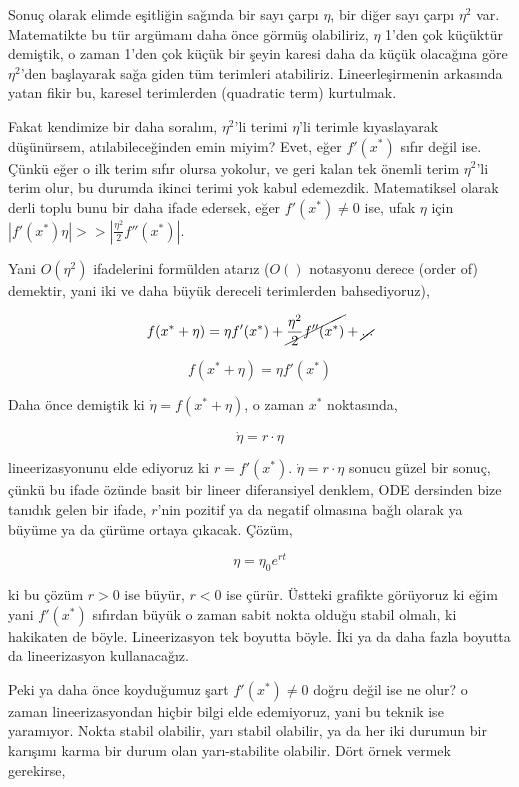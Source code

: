 \documentclass[12pt,fleqn]{article}\usepackage{../../common}
\begin{document}
Sonuç olarak elimde eşitliğin sağında bir sayı çarpı $\eta$, bir diğer sayı
çarpı $\eta^2$ var. Matematikte bu tür argümanı daha önce görmüş olabiliriz,
$\eta$ 1'den çok küçüktür demiştik, o zaman 1'den çok küçük bir şeyin karesi
daha da küçük olacağına göre $\eta^2$'den başlayarak sağa giden tüm terimleri
atabiliriz. Lineerleşirmenin arkasında yatan fikir bu, karesel terimlerden
(quadratic term) kurtulmak.

Fakat kendimize bir daha soralım, $\eta^2$'li terimi $\eta$'li terimle
kıyaslayarak düşünürsem, atılabileceğinden emin miyim? Evet, eğer $f'(x^\ast)$
sıfır değil ise. Çünkü eğer o ilk terim sıfır olursa yokolur, ve geri kalan tek
önemli terim $\eta^2$'li terim olur, bu durumda ikinci terimi yok kabul
edemezdik. Matematiksel olarak derli toplu bunu bir daha ifade edersek, eğer
$f'(x^\ast) \ne 0$ ise, ufak $\eta$ için $|f'(x^\ast) \eta| >> |\frac{\eta^2}{2}
f''(x^\ast)|$.

Yani $O(\eta^2)$ ifadelerini formülden atarız ($O()$ notasyonu derece (order of)
demektir, yani iki ve daha büyük dereceli terimlerden bahsediyoruz),

$$ f(x^\ast + \eta) =  \eta f'(x^\ast) + \cancel{\frac{\eta^2}{2}f''(x^\ast)} + \cancel{...}$$

$$ f(x^\ast + \eta) = \eta f'(x^\ast) $$

Daha önce demiştik ki $\dot{\eta} = f(x^\ast + \eta)$, o zaman $x^\ast$ noktasında,

$$\dot{\eta} = r \cdot \eta$$

lineerizasyonunu elde ediyoruz ki $r=f'(x^\ast)$. $\dot{\eta} = r \cdot \eta$ sonucu
güzel bir sonuç, çünkü bu ifade özünde basit bir lineer diferansiyel denklem,
ODE dersinden bize tanıdık gelen bir ifade, $r$'nin pozitif ya da negatif
olmasına bağlı olarak ya büyüme ya da çürüme ortaya çıkacak. Çözüm,

$$ \eta = \eta_0 e ^{rt} $$


ki bu çözüm $r > 0$ ise büyür, $r < 0$ ise çürür. Üstteki grafikte görüyoruz ki
eğim yani $f'(x^\ast)$ sıfırdan büyük o zaman sabit nokta olduğu stabil olmalı, ki
hakikaten de böyle. Lineerizasyon tek boyutta böyle. İki ya da daha fazla
boyutta da lineerizasyon kullanacağız. 

Peki ya daha önce koyduğumuz şart $f'(x^\ast) \ne 0$ doğru değil ise ne olur? o
zaman lineerizasyondan hiçbir bilgi elde edemiyoruz, yani bu teknik ise
yaramıyor. Nokta stabil olabilir, yarı stabil olabilir, ya da her iki durumun
bir karışımı karma bir durum olan yarı-stabilite olabilir. Dört örnek vermek
gerekirse,
\end{document}
